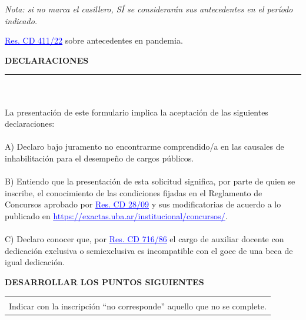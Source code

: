 \documentclass{article}
\newcommand{\titulosec}[1]{\textbf{\textsf{\MakeUppercase{#1}}}}
\newcommand{\seccion}[1]{
  \bigskip
  \noindent \titulosec{#1} \\
  \noindent\rule{\textwidth}{1pt}
}
\newcommand{\recuadro}[1]{
  \begin{center}
  \begin{tabular}{|m{0.9\textwidth}|}
      \hline
      \begin{center}
      \textsf{\textbf{#1}}
      \end{center}
      \\
      \hline
  \end{tabular}
  \end{center}
}
\newcommand{\enlace}[2]{\href{#1}{\textcolor{blue}{\underline{#2}}}}
\begin{document}
\noindent \textit{Nota: si no marca el casillero, SÍ se considerarán sus antecedentes en el período indicado.}

\noindent \enlace{https://exactas.uba.ar/wp-content/uploads/2022/04/CD-22-0411-MODIFICACION-REGLAMENTO.pdf}{Res. CD 411/22} sobre antecedentes en pandemia.

\seccion{Declaraciones}

\newpage

\noindent \hrulefill
\\\\
\noindent La presentación de este formulario implica la aceptación de las siguientes declaraciones:
\\\\
\noindent A) Declaro bajo juramento no encontrarme comprendido/a en las causales de inhabilitación para el desempeño de cargos públicos.
\\\\
\noindent B) Entiendo que la presentación de esta solicitud significa, por parte de quien se inscribe, el conocimiento de las condiciones fijadas en el Reglamento de Concursos aprobado por \enlace{https://exactas.uba.ar/wp-content/uploads/2022/12/Res.CD-28-09-Reglamento-Concursos-Docentes-Auxiliares.pdf}{Res. CD 28/09} y sus modificatorias de acuerdo a lo publicado en \enlace{https://exactas.uba.ar/institucional/concursos/}{https://exactas.uba.ar/institucional/concursos/}.
\\\\
\noindent C) Declaro conocer que, por \enlace{http://exactas.uba.ar/wp-content/uploads/2017/06/res.cd_716-86_incompatibilidad_de_cargo_con_beca.pdf}{Res. CD 716/86} el cargo de auxiliar docente con dedicación exclusiva o semiexclusiva es incompatible con el goce de una beca de igual dedicación.

\newpage

\noindent \titulosec{Desarrollar los Puntos Siguientes}

\recuadro{En todos los casos ordenar los antecedentes cronológicamente, poniendo primero los más recientes.\\Indicar con la inscripción “no corresponde” aquello que no se complete.}
\end{document}
